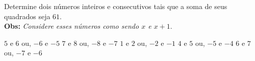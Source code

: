 Determine dois números inteiros e consecutivos tais que a soma de seus quadrados seja $61$.\\{\bf Obs: }{\it Considere esses números como sendo $x$ e $x+1$}.

$5$ e $6$ ou, $-6$ e $-5$
$7$ e $8$ ou, $-8$ e $-7$
$1$ e $2$ ou, $-2$ e $-1$
$4$ e $5$ ou, $-5$ e $-4$
$6$ e $7$ ou, $-7$ e $-6$



